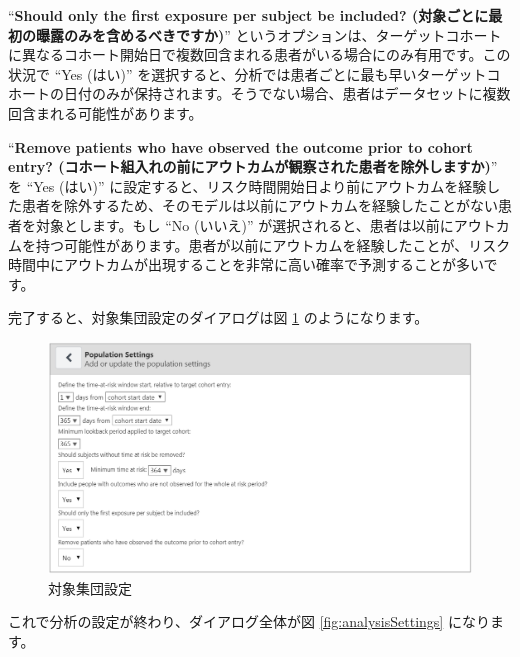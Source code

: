 \documentclass[
  11pt]{book}
\theoremstyle{definition}
\theoremstyle{definition}
\theoremstyle{definition}
\theoremstyle{definition}
\theoremstyle{remark}
\begin{document}
``\textbf{Should only the first exposure per subject be included? (対象ごとに最初の曝露のみを含めるべきですか)}'' というオプションは、ターゲットコホートに異なるコホート開始日で複数回含まれる患者がいる場合にのみ有用です。この状況で ``Yes (はい)'' を選択すると、分析では患者ごとに最も早いターゲットコホートの日付のみが保持されます。そうでない場合、患者はデータセットに複数回含まれる可能性があります。

``\textbf{Remove patients who have observed the outcome prior to cohort entry? (コホート組入れの前にアウトカムが観察された患者を除外しますか)}'' を ``Yes (はい)'' に設定すると、リスク時間開始日より前にアウトカムを経験した患者を除外するため、そのモデルは以前にアウトカムを経験したことがない患者を対象とします。もし ``No (いいえ)'' が選択されると、患者は以前にアウトカムを持つ可能性があります。患者が以前にアウトカムを経験したことが、リスク時間中にアウトカムが出現することを非常に高い確率で予測することが多いです。

完了すると、対象集団設定のダイアログは図 \ref{fig:populationSettings} のようになります。

\begin{figure}

{\centering \includegraphics[width=1\linewidth]{images/PatientLevelPrediction/populationSettings} 

}

\caption{対象集団設定}\label{fig:populationSettings}
\end{figure}

これで分析の設定が終わり、ダイアログ全体が図 \ref{fig:analysisSettings} になります。
\end{document}

